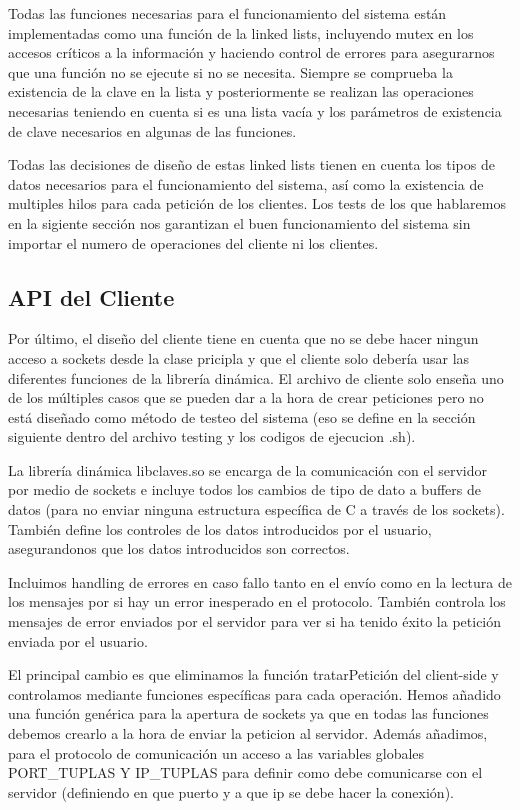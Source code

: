 Todas las funciones necesarias para el funcionamiento del sistema están implementadas como una función de la linked lists, incluyendo mutex en los accesos críticos a la información y haciendo control de errores para asegurarnos que una función no se ejecute si no se necesita. Siempre se comprueba la existencia de la clave en la lista y posteriormente se realizan las operaciones necesarias teniendo en cuenta si es una lista vacía y los parámetros de existencia de clave necesarios en algunas de las funciones.

Todas las decisiones de diseño de estas linked lists tienen en cuenta los tipos de datos necesarios para el funcionamiento del sistema, así como la existencia de multiples hilos para cada petición de los clientes. Los tests de los que hablaremos en la sigiente sección nos garantizan el buen funcionamiento del sistema sin importar el numero de operaciones del cliente ni los clientes.

\subsection{API del Cliente}

Por último, el diseño del cliente tiene en cuenta que no se debe hacer ningun acceso a sockets desde la clase pricipla y que el cliente solo debería usar las diferentes funciones de la librería dinámica. El archivo de cliente solo enseña uno de los múltiples casos que se pueden dar a la hora de crear peticiones pero no está diseñado como método de testeo del sistema (eso se define en la sección siguiente dentro del archivo testing y los codigos de ejecucion .sh). 

La librería dinámica libclaves.so se encarga de la comunicación con el servidor por medio de sockets e incluye todos los cambios de tipo de dato a buffers de datos (para no enviar ninguna estructura específica de C a través de los sockets). También define los controles de los datos introducidos por el usuario, asegurandonos que los datos introducidos son correctos. 

Incluimos handling de errores en caso fallo tanto en el envío como en la lectura de los mensajes por si hay un error inesperado en el protocolo. También controla los mensajes de error enviados por el servidor para ver si ha tenido éxito la petición enviada por el usuario.

El principal cambio es que eliminamos la función tratarPetición del client-side y controlamos mediante funciones específicas para cada operación. Hemos añadido una función genérica para la apertura de sockets ya que en todas las funciones debemos crearlo a la hora de enviar la peticion al servidor. Además añadimos, para el protocolo de comunicación un acceso a las variables globales PORT\_TUPLAS Y IP\_TUPLAS para definir como debe comunicarse con el servidor (definiendo en que puerto y a que ip se debe hacer la conexión).